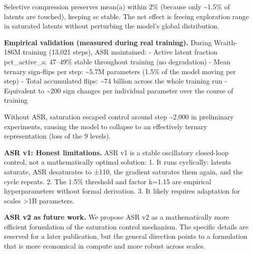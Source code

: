 \begin{Shaded}
\begin{Highlighting}[]
  \OperatorTok{|}\OperatorTok{|}\NormalTok{) }\OperatorTok{\textgreater{}} \OperatorTok{\%}\NormalTok{:}
\OperatorTok{=}\NormalTok{(} \OperatorTok{/} \NormalTok{) }\OperatorTok{=}
\OperatorTok{=}\OperatorTok{/} 
\end{Highlighting}
\end{Shaded}

Selective compression preserves mean(\textbar a\textbar) within 2\%
(because only \textasciitilde1.5\% of latents are touched), keeping sc
stable. The net effect is freeing exploration range in saturated latents
without perturbing the model's global distribution.

\textbf{Empirical validation (measured during real training).} During
Wraith-186M training (13,021 steps), ASR maintained: - Active latent
fraction pct\_active\_a: 47--49\% stable throughout training (no
degradation) - Mean ternary sign-flips per step: \textasciitilde5.7M
parameters (1.5\% of the model moving per step) - Total accumulated
flips: \textasciitilde74 billion across the whole training run -
Equivalent to \textasciitilde200 sign changes per individual parameter
over the course of training

Without ASR, saturation escaped control around step \textasciitilde2,000
in preliminary experiments, causing the model to collapse to an
effectively ternary representation (loss of the 9 levels).

\textbf{ASR v1: Honest limitations.} ASR v1 is a stable oscillatory
closed-loop control, not a mathematically optimal solution: 1. It runs
cyclically: latents saturate, ASR desaturates to ±110, the gradient
saturates them again, and the cycle repeats. 2. The 1.5\% threshold and
factor k=1.15 are empirical hyperparameters without formal derivation.
3. It likely requires adaptation for scales \textgreater1B parameters.

\textbf{ASR v2 as future work.} We propose ASR v2 as a mathematically
more efficient formulation of the saturation control mechanism. The
specific details are reserved for a later publication, but the general
direction points to a formulation that is more economical in compute and
more robust across scales.


